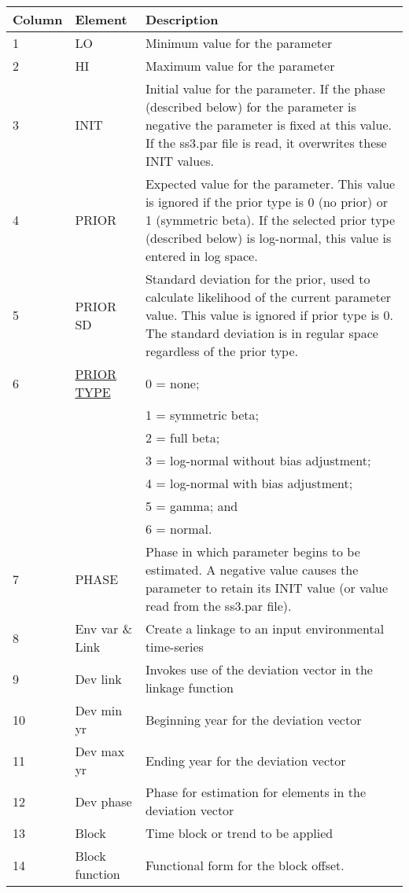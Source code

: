 \hypertarget{Priors}{} \hypertarget{paraOrder}{}
\begin{center}
	\begin{tabular}{p{2cm} p{3cm} p{10cm}}
		\hline
		Column & Element & Description \Tstrut\Bstrut\\
		\hline
		1 & LO & Minimum value for the parameter \Tstrut\\
		2 & HI & Maximum value for the parameter \Tstrut\\
		3 \Tstrut & INIT & Initial value for the parameter. If the phase (described below) for the parameter is negative the parameter is fixed at this value. If the ss3.par file is read, it overwrites these INIT values.\\
		4 \Tstrut & PRIOR & Expected value for the parameter. This value is ignored if the prior type is 0 (no prior) or 1 (symmetric beta). If the selected prior type (described below) is log-normal, this value is entered in log space. \\
		5 \Tstrut & PRIOR SD & Standard deviation for the prior, used to calculate likelihood of the current parameter value. This value is ignored if prior type is 0. The standard deviation is in regular space regardless of the prior type. \\
		6 \Tstrut & \hyperlink{PriorDescrip}{PRIOR TYPE} & 0 = none; \\
		& & 1 = symmetric beta; \\
		& & 2 = full beta; \\
		& & 3 = log-normal without bias adjustment; \\
		& & 4 = log-normal with bias adjustment; \\
		& & 5 = gamma; and \\
		& & 6 = normal. \\
		7 \Tstrut & PHASE & Phase in which parameter begins to be estimated. A negative value causes the parameter to retain its INIT value (or value read from the ss3.par file). \Bstrut\\
		8 \Tstrut & Env var \& Link & Create a linkage to an input environmental time-series \\
		9 \Tstrut & Dev link & Invokes use of the deviation vector in the linkage function \\
		10 \Tstrut & Dev min yr & Beginning year for the deviation vector \\
		11 \Tstrut & Dev max yr & Ending year for the deviation vector \\
		12 \Tstrut & Dev phase & Phase for estimation for elements in the deviation vector \\
		13 \Tstrut & Block & Time block or trend to be applied \\
		14 \Tstrut & Block function & Functional form for the block offset. \Bstrut\\
		\hline
	\end{tabular}
\end{center}

